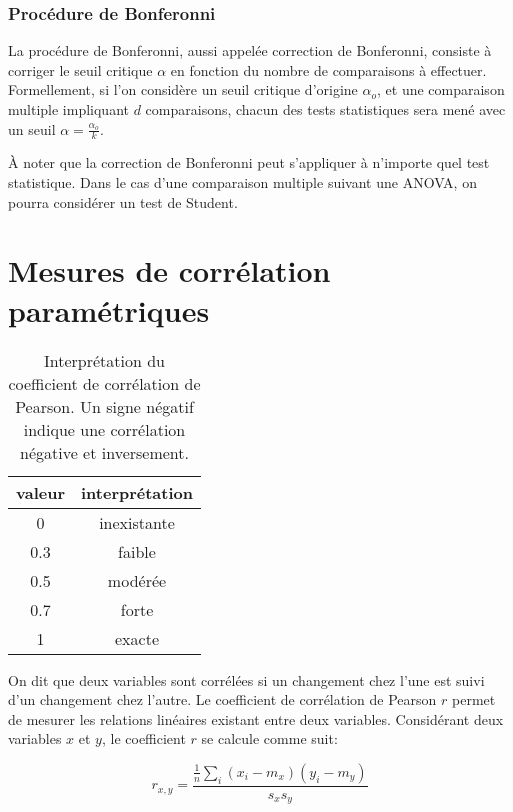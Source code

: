 \subsubsection{Procédure de Bonferonni}

La procédure de Bonferonni, aussi appelée correction de Bonferonni, consiste à corriger le seuil critique $\alpha$ en fonction du nombre de comparaisons à effectuer. Formellement, si l'on considère un seuil critique d'origine $\alpha_{o}$, et une comparaison multiple impliquant $d$ comparaisons, chacun des tests statistiques sera mené avec un seuil $\alpha=\frac{\alpha_{o}}{k}$. 

À noter que la correction de Bonferonni peut s'appliquer à n'importe quel test statistique. Dans le cas d'une comparaison multiple suivant une ANOVA, on pourra considérer un test de Student.

\section{Mesures de corrélation paramétriques}
\label{app:corr}

\begin{table}[t]
\centering
\begin{tabular}{c c }  
valeur & interprétation  \\      
\hline
0   & inexistante \\
0.3 & faible \\
0.5 & modérée \\
0.7 & forte \\
1   & exacte \\
\hline
\end{tabular}
\vspace{0.5mm}
\caption[Interprétation du coefficient de corrélation de Pearson.]{Interprétation du coefficient de corrélation de Pearson. Un signe négatif indique une corrélation négative et inversement.}
\label{tab:coefPearson}
\end{table}

On dit que deux variables sont corrélées si un changement chez l'une est suivi d'un changement chez l'autre. Le coefficient de corrélation de Pearson $r$ permet de mesurer les relations linéaires existant entre deux variables. Considérant deux variables $x$ et $y$, le coefficient $r$ se calcule comme suit:

\begin{equation}
r_{x,y}=\dfrac{\frac{1}{n}\sum\limits_i(x_i - m_x)(y_i-m_y)}{s_x s_y}
\end{equation}

